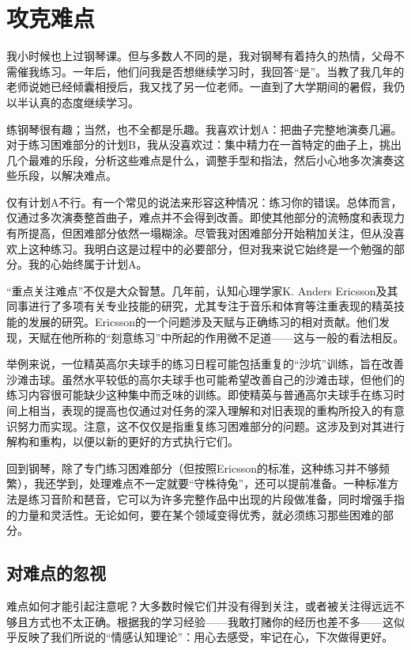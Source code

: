 \chapter{攻克难点}

我小时候也上过钢琴课。但与多数人不同的是，我对钢琴有着持久的热情，父母不需催我练习。一年后，他们问我是否想继续学习时，我回答“是”。当教了我几年的老师说她已经倾囊相授后，我又找了另一位老师。一直到了大学期间的暑假，我仍以半认真的态度继续学习。

练钢琴很有趣；当然，也不全都是乐趣。我喜欢计划A：把曲子完整地演奏几遍。对于练习困难部分的计划B，我从没喜欢过：集中精力在一首特定的曲子上，挑出几个最难的乐段，分析这些难点是什么，调整手型和指法，然后小心地多次演奏这些乐段，以解决难点。

仅有计划A不行。有一个常见的说法来形容这种情况：练习你的错误。总体而言，仅通过多次演奏整首曲子，难点并不会得到改善。即使其他部分的流畅度和表现力有所提高，但困难部分依然一塌糊涂。尽管我对困难部分开始稍加关注，但从没喜欢上这种练习。我明白这是过程中的必要部分，但对我来说它始终是一个勉强的部分。我的心始终属于计划A。

“重点关注难点”不仅是大众智慧。几年前，认知心理学家K. Anders Ericsson及其同事进行了多项有关专业技能的研究，尤其专注于音乐和体育等注重表现的精英技能的发展的研究。Ericsson的一个问题涉及天赋与正确练习的相对贡献。他们发现，天赋在他所称的“刻意练习”中所起的作用微不足道——这与一般的看法相反。

举例来说，一位精英高尔夫球手的练习日程可能包括重复的“沙坑”训练，旨在改善沙滩击球。虽然水平较低的高尔夫球手也可能希望改善自己的沙滩击球，但他们的练习内容很可能缺少这种集中而乏味的训练。即使精英与普通高尔夫球手在练习时间上相当，表现的提高也仅通过对任务的深入理解和对旧表现的重构所投入的有意识努力而实现。注意，这不仅仅是指重复练习困难部分的问题。这涉及到对其进行解构和重构，以便以新的更好的方式执行它们。

回到钢琴，除了专门练习困难部分（但按照Ericsson的标准，这种练习并不够频繁），我还学到，处理难点不一定就要“守株待兔”，还可以提前准备。一种标准方法是练习音阶和琶音，它可以为许多完整作品中出现的片段做准备，同时增强手指的力量和灵活性。无论如何，要在某个领域变得优秀，就必须练习那些困难的部分。

\section*{对难点的忽视}

难点如何才能引起注意呢？大多数时候它们并没有得到关注，或者被关注得远远不够且方式也不太正确。根据我的学习经验——我敢打赌你的经历也差不多——这似乎反映了我们所说的“情感认知理论”：用心去感受，牢记在心，下次做得更好。

